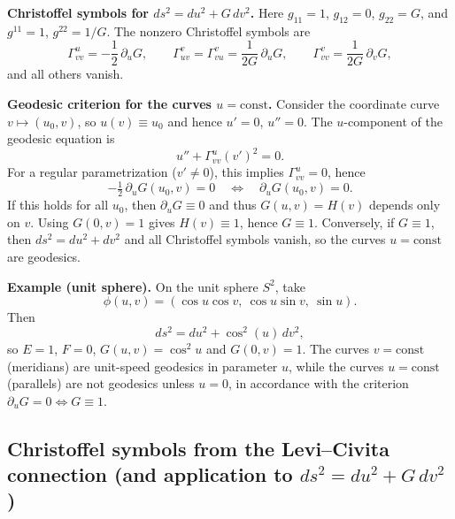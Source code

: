 \documentclass[12pt,a4paper]{article}
\theoremstyle{plain}
\theoremstyle{definition}      %
\begin{document}
\medskip
\textbf{Christoffel symbols for $ds^2=du^2+G\,dv^2$.}
Here $g_{11}=1$, $g_{12}=0$, $g_{22}=G$, and $g^{11}=1$, $g^{22}=1/G$.
The nonzero Christoffel symbols are
\[
\Gamma^{u}_{vv} = -\frac12\,\partial_u G,
\qquad
\Gamma^{v}_{uv}=\Gamma^{v}_{vu} = \frac{1}{2G}\,\partial_u G,
\qquad
\Gamma^{v}_{vv} = \frac{1}{2G}\,\partial_v G,
\]
and all others vanish.

\medskip
\textbf{Geodesic criterion for the curves $u=\text{const}$.}
Consider the coordinate curve $v\mapsto (u_0,v)$, so $u(v)\equiv u_0$ and hence $u'=0$, $u''=0$.
The $u$-component of the geodesic equation is
\[
u'' + \Gamma^{u}_{vv}(v')^2 = 0.
\]
For a regular parametrization ($v'\neq 0$), this implies $\Gamma^{u}_{vv}=0$, hence
\[
-\tfrac12\,\partial_u G(u_0,v)=0 \quad\Longleftrightarrow\quad \partial_u G(u_0,v)=0.
\]
If this holds for all $u_0$, then $\partial_u G\equiv 0$ and thus $G(u,v)=H(v)$ depends only on $v$.
Using $G(0,v)=1$ gives $H(v)\equiv 1$, hence $G\equiv 1$.
Conversely, if $G\equiv 1$, then $ds^2=du^2+dv^2$ and all Christoffel symbols vanish, so the curves
$u=\text{const}$ are geodesics.

\medskip
\textbf{Example (unit sphere).}
On the unit sphere $S^2$, take
\[
\phi(u,v)=(\cos u\cos v,\ \cos u\sin v,\ \sin u).
\]
Then
\[
ds^2 = du^2 + \cos^2(u)\,dv^2,
\]
so $E=1$, $F=0$, $G(u,v)=\cos^2 u$ and $G(0,v)=1$.
The curves $v=\text{const}$ (meridians) are unit-speed geodesics in parameter $u$,
while the curves $u=\text{const}$ (parallels) are not geodesics unless $u=0$,
in accordance with the criterion $\partial_u G=0 \iff G\equiv 1$.

	\subsection*{Christoffel symbols from the Levi--Civita connection (and application to $ds^2=du^2+G\,dv^2$)}
	
\end{document}
